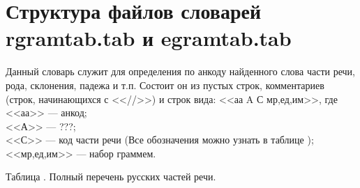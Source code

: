 \documentclass[12pt,a4paper,onecolumn]{report}
\begin{document}
\chapter{Структура файлов словарей rgramtab.tab и egramtab.tab}
Данный словарь служит для определения по анкоду найденного слова части речи, рода, склонения, падежа и т.п.
Состоит он из пустых строк, комментариев (строк, начинающихся с <<//>>) и строк вида: <<аа A С мр,ед,им>>, где\\
<<аа>> --- анкод;\\
<<А>> --- ???;\\
<<С>> --- код части речи (Все обозначения можно узнать в таблице );\\
<<мр,ед,им>> --- набор граммем.
\begin{flushright}
Таблица . Полный перечень русских частей речи.
\end{flushright}
\end{document}
